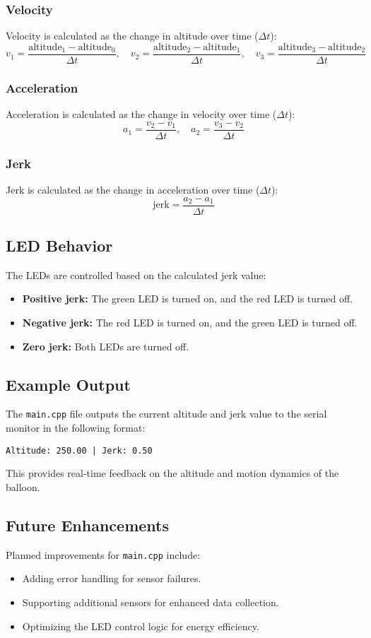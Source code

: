 \documentclass{article}
\begin{document}
\subsubsection{Velocity}
Velocity is calculated as the change in altitude over time (\( \Delta t \)):
\[
v_1 = \frac{\text{altitude}_1 - \text{altitude}_0}{\Delta t}, \quad
v_2 = \frac{\text{altitude}_2 - \text{altitude}_1}{\Delta t}, \quad
v_3 = \frac{\text{altitude}_3 - \text{altitude}_2}{\Delta t}
\]

\subsubsection{Acceleration}
Acceleration is calculated as the change in velocity over time (\( \Delta t \)):
\[
a_1 = \frac{v_2 - v_1}{\Delta t}, \quad
a_2 = \frac{v_3 - v_2}{\Delta t}
\]

\subsubsection{Jerk}
Jerk is calculated as the change in acceleration over time (\( \Delta t \)):
\[
\text{jerk} = \frac{a_2 - a_1}{\Delta t}
\]

\subsection{LED Behavior}
The LEDs are controlled based on the calculated jerk value:
\begin{itemize}
    \item \textbf{Positive jerk:} The green LED is turned on, and the red LED is turned off.
    \item \textbf{Negative jerk:} The red LED is turned on, and the green LED is turned off.
    \item \textbf{Zero jerk:} Both LEDs are turned off.
\end{itemize}

\subsection{Example Output}
The \texttt{main.cpp} file outputs the current altitude and jerk value to the serial monitor in the following format:
\begin{verbatim}
Altitude: 250.00 | Jerk: 0.50
\end{verbatim}

This provides real-time feedback on the altitude and motion dynamics of the balloon.

\subsection{Future Enhancements}
Planned improvements for \texttt{main.cpp} include:
\begin{itemize}
    \item Adding error handling for sensor failures.
    \item Supporting additional sensors for enhanced data collection.
    \item Optimizing the LED control logic for energy efficiency.
\end{itemize}
\end{document}
